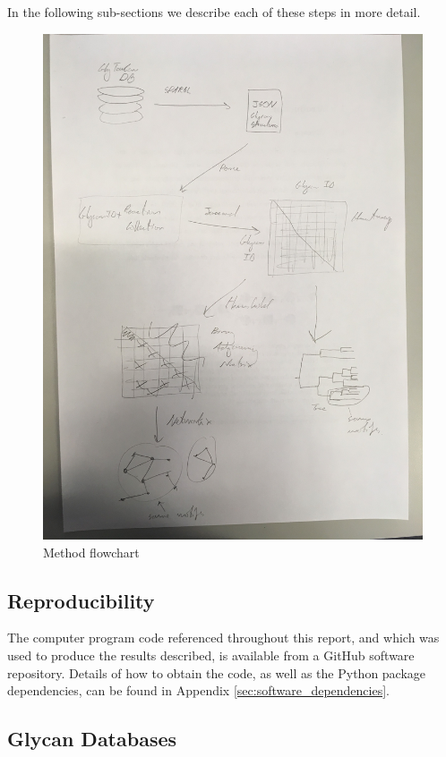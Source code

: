 \documentclass[12pt,a4paper]{article}
\begin{document}
In the following sub-sections we describe each of these steps in more detail.

\begin{figure}[H]
\centering 
\includegraphics[scale=0.12]{images/flowchart.JPG} 
\caption{Method flowchart}
\label{fig:flowchart}
\end{figure}

\subsection{Reproducibility}
\label{sec:reproducibility}
The computer program code referenced throughout this report, and which was used to produce the results described, is available from a GitHub software repository. Details of how to obtain the code, as well as the Python package dependencies, can be found in Appendix \ref{sec:software_dependencies}. 

\subsection{Glycan Databases}
\label{sec:glycan_databases}
\end{document}
